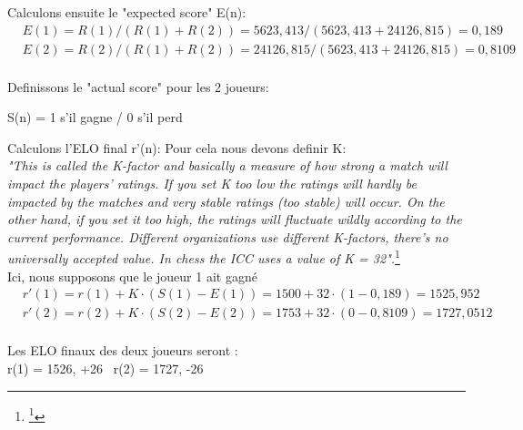 \documentclass[11pt,a4paper,titlepage]{article}
\begin{document}
    Calculons ensuite le "expected score" E(n):
    \begin{equation}
        \begin{split}
            & E(1) = R(1) / ( R(1) + R(2)) = 5623,413 / (5623,413 + 24126,815) = 0,189 \\
            & E(2) = R(2) / ( R(1) + R(2)) = 24126,815 / (5623,413 + 24126,815) = 0,8109 \\
        \end{split}
    \end{equation}

    Definissons le "actual score" pour les 2 joueurs:
    \begin{center}
        S(n) = 1 s'il gagne / 0 s'il perd
    \end{center}
    
    Calculons l'ELO final r'(n):
    Pour cela nous devons definir K: \\
    \textit{"This is called the K-factor and basically a measure of how strong a match will impact the players’ ratings.
    If you set K too low the ratings will hardly be impacted by the matches and very stable ratings (too stable) will occur.
    On the other hand, if you set it too high, the ratings will fluctuate wildly according to the current performance.
     Different organizations use different K-factors, there’s no universally accepted value. In chess the ICC uses a value of K = 32".}\footnote{\footnote{\href{https://metinmediamath.wordpress.com/2013/11/27/how-to-calculate-the-elo-rating-including-example/}{Metin's Media and Math, How To Calculate the Elo-Rating }}} \\
    Ici, nous supposons que le joueur 1 ait gagné
    \begin{equation}
        \begin{split}
           & r'(1) = r(1) + K \cdot (S(1) - E(1)) = 1500 + 32 \cdot (1 - 0,189) = 1525,952 \\
           & r'(2) = r(2) + K \cdot (S(2) - E(2)) = 1753 + 32 \cdot (0-0,8109) = 1727,0512 \\
        \end{split}
    \end{equation}

    Les ELO finaux des deux joueurs seront : \\

        r(1) = 1526, +26 \ r(2) = 1727, -26
    
\end{document}
